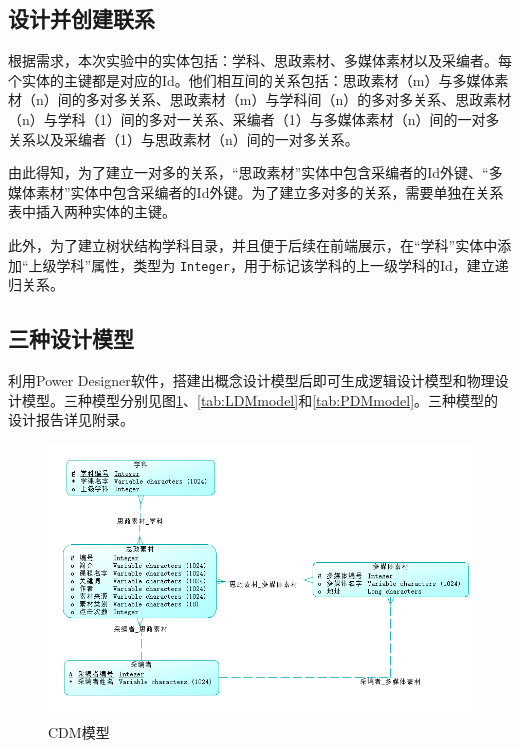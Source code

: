 \documentclass[11pt]{article}
\begin{document}
  \subsection{设计并创建联系}

  根据需求，本次实验中的实体包括：学科、思政素材、多媒体素材以及采编者。每个实体的主键都是对应的Id。他们相互间的关系包括：思政素材（m）与多媒体素材（n）间的多对多关系、思政素材（m）与学科间（n）的多对多关系、思政素材（n）与学科（1）间的多对一关系、采编者（1）与多媒体素材（n）间的一对多关系以及采编者（1）与思政素材（n）间的一对多关系。

  由此得知，为了建立一对多的关系，“思政素材”实体中包含采编者的Id外键、“多媒体素材”实体中包含采编者的Id外键。为了建立多对多的关系，需要单独在关系表中插入两种实体的主键。

  此外，为了建立树状结构学科目录，并且便于后续在前端展示，在“学科”实体中添加“上级学科”属性，类型为 \verb|Integer|，用于标记该学科的上一级学科的Id，建立递归关系。

  \subsection{三种设计模型}
  利用Power Designer软件，搭建出概念设计模型后即可生成逻辑设计模型和物理设计模型。三种模型分别见图\ref{tab:CDMmodel}、\ref{tab:LDMmodel}和\ref{tab:PDMmodel}。三种模型的设计报告详见附录。

  \begin{figure}[h]
    \centering
    \includegraphics[width=\textwidth]{CDM模型.png}
    \caption{CDM模型}
    \label{tab:CDMmodel}
  \end{figure}
\end{document}
